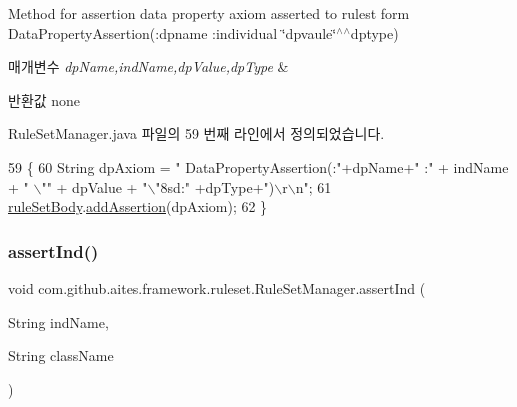 Method for assertion data property axiom asserted to rulest form Data\+Property\+Assertion(\+:dpname \+:individual \char`\"{}dpvaule\char`\"{}$^\wedge$$^\wedge$dptype) 


\begin{DoxyParams}{매개변수}
{\em dp\+Name,ind\+Name,dp\+Value,dp\+Type} & \\
\hline
\end{DoxyParams}
\begin{DoxyReturn}{반환값}
none 
\end{DoxyReturn}


Rule\+Set\+Manager.\+java 파일의 59 번째 라인에서 정의되었습니다.


\begin{DoxyCode}
59                                                                                                 \{
60         String dpAxiom = \textcolor{stringliteral}{"    DataPropertyAssertion(:"}+dpName+\textcolor{stringliteral}{" :"} + indName + \textcolor{stringliteral}{" \(\backslash\)""} + dpValue + \textcolor{stringliteral}{"\(\backslash\)"^^xsd:"}
      +dpType+\textcolor{stringliteral}{")\(\backslash\)r\(\backslash\)n"};
61         \mbox{\hyperlink{classcom_1_1github_1_1aites_1_1framework_1_1ruleset_1_1_rule_set_manager_a2218521e8abc1048bd369c7ed1c14c60}{ruleSetBody}}.\mbox{\hyperlink{classcom_1_1github_1_1aites_1_1framework_1_1ruleset_1_1_rule_set_body_ab9c0acf9f356fb04a249b1ea492b65c4}{addAssertion}}(dpAxiom);
62     \}
\end{DoxyCode}
\mbox{\label{classcom_1_1github_1_1aites_1_1framework_1_1ruleset_1_1_rule_set_manager_a318aa8ad8be68347f57363e374c429f5}} 
\subsubsection{\texorpdfstring{assert\+Ind()}{assertInd()}}
{\footnotesize\ttfamily void com.\+github.\+aites.\+framework.\+ruleset.\+Rule\+Set\+Manager.\+assert\+Ind (\begin{DoxyParamCaption}\item[{String}]{ind\+Name,  }\item[{String}]{class\+Name }\end{DoxyParamCaption})}



